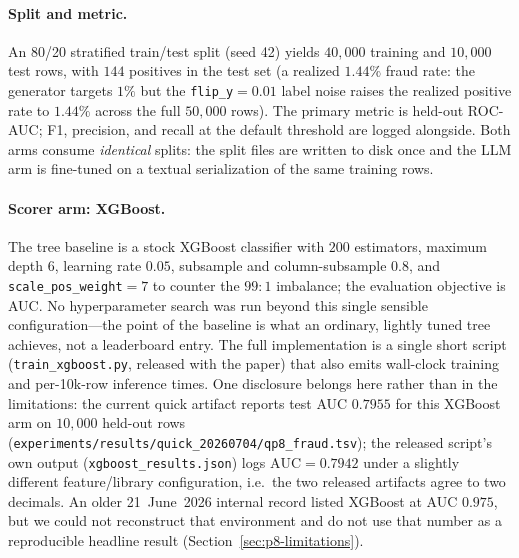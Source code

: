 \documentclass{article}
\providecommand{\secref}[1]{Section~\ref{#1}}
\begin{document}
\paragraph{Split and metric.}
An 80/20 stratified train/test split (seed 42) yields $40{,}000$ training and
$10{,}000$ test rows, with $144$ positives in the test set (a realized
$1.44\%$ fraud rate: the generator targets $1\%$ but the
\texttt{flip\_y}$=0.01$ label noise raises the realized positive rate to
$1.44\%$ across the full $50{,}000$ rows). The primary
metric is held-out ROC-AUC; F1, precision, and recall at the default threshold
are logged alongside. Both arms consume \emph{identical} splits: the split
files are written to disk once and the LLM arm is fine-tuned on a textual
serialization of the same training rows.

\paragraph{Scorer arm: XGBoost.}
The tree baseline is a stock XGBoost classifier \citep{chen2016xgboost} with
$200$ estimators, maximum depth $6$, learning rate $0.05$, subsample and
column-subsample $0.8$, and \texttt{scale\_pos\_weight}$=7$ to counter the
$99{:}1$ imbalance; the evaluation objective is AUC. No hyperparameter search
was run beyond this single sensible configuration---the point of the baseline
is what an ordinary, lightly tuned tree achieves, not a leaderboard entry. The
full implementation is a single short script (\texttt{train\_xgboost.py},
released with the paper) that also emits wall-clock training and per-10k-row
inference times. One disclosure belongs here rather than in the limitations:
the current quick artifact reports test AUC $0.7955$ for this XGBoost arm
on $10{,}000$ held-out rows
(\texttt{experiments/results/quick\_20260704/qp8\_fraud.tsv}); the released
script's own output (\texttt{xgboost\_results.json}) logs
$\mathrm{AUC}{=}0.7942$ under a slightly different feature/library
configuration, i.e.\ the two released artifacts agree to two decimals. An older
21~June~2026 internal record listed XGBoost at AUC $0.975$, but we could not
reconstruct that environment and do not use that number as a reproducible
headline result (\secref{sec:p8-limitations}).
\end{document}
